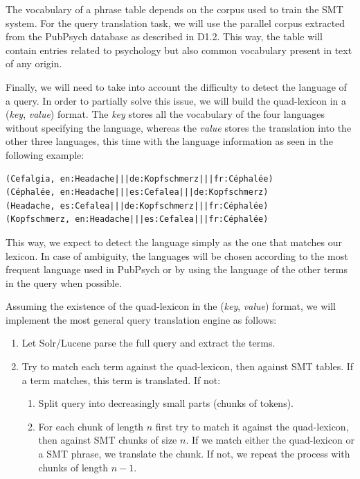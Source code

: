 \documentclass[a4paper,11pt]{article}
\begin{document}
The vocabulary of a phrase table depends on the corpus used to train the SMT system. For the query translation task, we will use the parallel corpus extracted from the PubPsych database as described in D1.2. This way, the table will contain entries related to psychology but also common vocabulary present in text of any origin.

Finally, we will need to take into account the difficulty to detect the language of a query. In order to partially solve this issue, we will build the quad-lexicon in a (\emph{key}, \emph{value}) format. The \emph{key} stores all the vocabulary of the four languages without specifying the language, whereas the \emph{value} stores the translation into the other three languages, this time with the language information as seen in the following example:
{\small
\begin{verbatim}
(Cefalgia, en:Headache|||de:Kopfschmerz|||fr:Céphalée)
(Céphalée, en:Headache|||es:Cefalea|||de:Kopfschmerz)
(Headache, es:Cefalea|||de:Kopfschmerz|||fr:Céphalée)
(Kopfschmerz, en:Headache|||es:Cefalea|||fr:Céphalée)
\end{verbatim}
}

\noindent This way, we expect to detect the language simply as the one that matches our lexicon. In case of ambiguity, the languages will be chosen according to the most frequent language used in PubPsych or by using the language of the other terms in the query when possible.

Assuming the existence of the quad-lexicon in the (\emph{key}, \emph{value}) format, we will implement the most general query translation engine as follows:

\begin{enumerate}
 \item Let Solr/Lucene parse the full query and extract the terms.
 \item Try to match each term against the quad-lexicon, then against SMT tables. If a term matches, this term is translated. If not:
 \begin{enumerate}[label*=\arabic*.]
 \item Split query into decreasingly small parts (chunks of tokens).
 \item For each chunk of length $n$ first try to match it against the quad-lexicon, then against SMT chunks of size $n$. If we match either the quad-lexicon or a SMT phrase, we translate the chunk. If not, we repeat the process with chunks of length $n-1$.
 \end{enumerate}
\end{enumerate}
\end{document}
